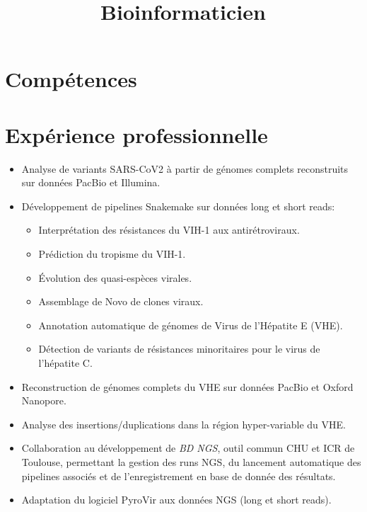 \documentclass[11pt,a4paper,sans,colorlinks,linkcolor=yellow]{moderncv}
\title{Bioinformaticien}
\begin{document}
\hypersetup{urlcolor=links}

\makecvtitle

\section{Compétences}

\section{Expérience professionnelle}
{
\begin{itemize}
\item Analyse de variants SARS-CoV2 à partir de génomes complets reconstruits sur données PacBio et Illumina.
\item Développement de pipelines Snakemake sur données long et short reads:
	\begin{itemize}
	\item Interprétation des résistances du VIH-1 aux antirétroviraux.
	\item Prédiction du tropisme du VIH-1.
	\item Évolution des quasi-espèces virales.
	\item Assemblage de Novo de clones viraux.
	\item Annotation automatique de génomes de Virus de l'Hépatite E (VHE).
	\item Détection de variants de résistances minoritaires pour le virus de l'hépatite C.
	\end{itemize}
\item Reconstruction de génomes complets du VHE sur données PacBio et Oxford Nanopore.
\item Analyse des insertions/duplications dans la région hyper-variable du VHE.
\item Collaboration au développement de \emph{BD NGS}, outil commun CHU et ICR de Toulouse, permettant la gestion des runs NGS, du lancement automatique des pipelines associés et de l'enregistrement en base de donnée des résultats.
\item Adaptation du logiciel PyroVir aux données NGS (long et short reads).
\end{itemize}}
\end{document}
